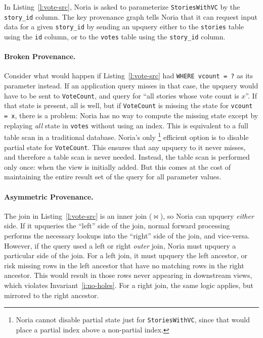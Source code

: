In Listing~\ref{l:vote-src}, Noria is asked to parameterize
\texttt{StoriesWithVC} by the \texttt{story\_id} column. The key provenance
graph tells Noria that it can request input data for a given \texttt{story\_id}
by sending an upquery either to the \texttt{stories} table using the \texttt{id}
column, or to the \texttt{votes} table using the \texttt{story\_id} column.

\paragraph{Broken Provenance.}
Consider what would happen if Listing~\ref{l:vote-src} had \texttt{WHERE vcount
= ?} as its parameter instead. If an application query misses in that case, the
upquery would have to be sent to \texttt{VoteCount}, and query for ``all stories
whose vote count is $x$''. If that state is present, all is well, but if
\texttt{VoteCount} is missing the state for \texttt{vcount = x}, there is a
problem: Noria has no way to compute the missing state except by replaying
\emph{all} state in \texttt{votes} without using an index. This is equivalent to
a full table scan in a traditional database. Noria's only%
%
\footnote{Noria cannot disable partial state just for \texttt{StoriesWithVC},
since that would place a partial index above a non-partial index.}
%
efficient option is to disable partial
state for \texttt{VoteCount}. This ensures that any upquery to it never misses,
and therefore a table scan is never needed. Instead, the table scan is performed
only once: when the view is initially added. But this comes at the cost of
maintaining the entire result set of the query for all parameter values.

\paragraph{Asymmetric Provenance.}
The join in Listing~\ref{l:vote-src} is an inner join ($\bowtie$), so Noria can
upquery \emph{either} side. If it upqueries the ``left'' side of the join,
normal forward processing performs the necessary lookups into the ``right'' side
of the join, and vice-versa. However, if the query used a left or right
\emph{outer} join, Noria must upquery a particular side of the join. For a left
join, it must upquery the left ancestor, or risk missing rows in the left
ancestor that have no matching rows in the right ancestor. This would result in
those rows never appearing in downstream views, which violates
Invariant~\ref{i:no-holes}. For a right join, the same logic applies, but
mirrored to the right ancestor.

